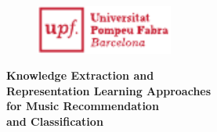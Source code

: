 
\newpage
\thispagestyle{empty}
\begin{titlingpage}
\begin{flushright}

  \begin{figure}[t]
    \begin{flushright}
      \includegraphics[width=4.5cm]{ch00_pics/upf-logo-bo}
    \end{flushright}
  \end{figure}

  \vspace*{2.2cm} 


  {\huge \textbf{Knowledge Extraction and \\ \vspace*{0.15cm} Representation Learning Approaches\\ \vspace*{0.10cm} for Music Recommendation \\ \vspace*{0.45cm} and Classification}}


\end{flushright}
\end{titlingpage}

